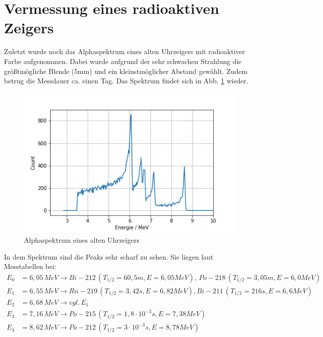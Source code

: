 \section{Vermessung eines radioaktiven Zeigers}

Zuletzt wurde noch das Alphaspektrum eines alten Uhrzeigers mit radioaktiver Farbe aufgenommen. Dabei wurde aufgrund der sehr schwachen 
Strahlung die größtmögliche Blende (5mm) und ein kleinstmöglicher Abstand gewählt. Zudem betrug die Messdauer ca. einen Tag. Das 
Spektrum findet sich in Abb. \ref{bild:uhr} wieder. \\

\begin{figure}[h]
    \centering
    \includegraphics[scale=0.75]{Bilder/uhr.png}
    \caption{Alphaspektrum eines alten Uhrzeigers}
    \label{bild:uhr}
\end{figure}

In dem Spektrum sind die Peaks sehr scharf zu sehen. Sie liegen laut Messtabellen bei: \\

\begin{align*}
    E_0 &= 6,05 \, MeV \to Bi-212 \, (T_{1/2} = 60,5m, E = 6,05 MeV),\, Po-218 \, (T_{1/2} = 3,05m, E = 6,0 MeV) \\
    E_1 &= 6,55 \, MeV \to Rn-219 \, (T_{1/2} = 3,42s, E = 6,82 MeV), Bi-211 \, (T_{1/2} = 216s, E = 6,6 MeV)\\
    E_2 &= 6,68 \, MeV \to vgl. \, E_1 \\
    E_3 &= 7,16 \, MeV \to Po-215 \, (T_{1/2} = 1,8 \cdot 10^{-3}s, E = 7,38 MeV) \\
    E_4 &= 8,62 \, MeV \to Po-212 \, (T_{1/2} = 3 \cdot 10^{-3}s, E = 8,78 MeV) \\
\end{align*}

